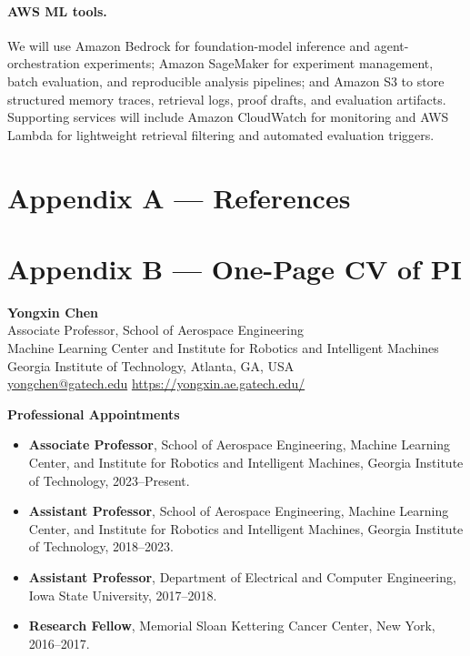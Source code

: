 \documentclass[11pt]{article}
\begin{document}
\vspace{-6pt}
\paragraph{AWS ML tools.} We will use Amazon Bedrock for foundation-model inference and agent-orchestration experiments; Amazon SageMaker for experiment management, batch evaluation, and reproducible analysis pipelines; and Amazon S3 to store structured memory traces, retrieval logs, proof drafts, and evaluation artifacts. Supporting services will include Amazon CloudWatch for monitoring and AWS Lambda for lightweight retrieval filtering and automated evaluation triggers.

\section*{Appendix A --- References}


\newpage
\section*{Appendix B --- One-Page CV of PI}

\begin{center}
    {\large \textbf{Yongxin Chen}}\\[-1pt]
    Associate Professor, School of Aerospace Engineering \\
    Machine Learning Center and Institute for Robotics and Intelligent Machines \\
    Georgia Institute of Technology, Atlanta, GA, USA \\
    \href{mailto:yongchen@gatech.edu}{yongchen@gatech.edu}
    \qquad
    \href{https://yongxin.ae.gatech.edu/}{https://yongxin.ae.gatech.edu/}
\end{center}

\vspace{-6pt}

\noindent\textbf{Professional Appointments}
\begin{itemize}
    \item \textbf{Associate Professor}, School of Aerospace Engineering, Machine Learning Center, and Institute for Robotics and Intelligent Machines, Georgia Institute of Technology, 2023--Present.
    \item \textbf{Assistant Professor}, School of Aerospace Engineering, Machine Learning Center, and Institute for Robotics and Intelligent Machines, Georgia Institute of Technology, 2018--2023.
    \item \textbf{Assistant Professor}, Department of Electrical and Computer Engineering, Iowa State University, 2017--2018.
    \item \textbf{Research Fellow}, Memorial Sloan Kettering Cancer Center, New York, 2016--2017.
\end{itemize}
\end{document}
